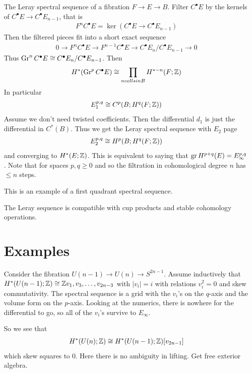 \documentclass[12pt]{article}
\begin{document}
\begin{example}
    The Leray spectral sequence of a fibration $F \to E \to B$. Filter $C^\bullet E$ by the kernels of $C^\bullet E \to C^\bullet E_{n-1}$, that is \begin{align*}
    F^n C^\bullet E = \ker(C^\bullet E \to C^\bullet E_{n-1})
    \end{align*} Then the filtered pieces fit into a short exact sequence \begin{align*}
        0 \to F^n C^\bullet E \to F^{n-1} C^\bullet E \to C^\bullet E_n / C^\bullet E_{n-1} \to 0
    \end{align*} 
    Thus $\operatorname{Gr}^n C^\bullet E \cong C^\bullet E_n / C^\bullet E_{n-1}$. Then \begin{align*}
                H^*(\operatorname{Gr}^p C^\bullet E) \cong \prod_{n cells in B} H^{* - n}(F;\mathbb{Z})
    \end{align*} In particular
    \begin{align*}
        E_1^{p,q} \cong C^p(B;H^q(F;\mathbb{Z}))
    \end{align*}
    Assume we don't need twisted coefficients. Then the differential $d_1$ is just the differential in $C^*(B)$. Thus we get the Leray spectral sequence with $E_2$ page \begin{align*}
    E_2^{p,q} \cong H^p(B;H^q(F;\mathbb{Z}))
    \end{align*} and converging to $H^*(E;\mathbb{Z})$. This is equivalent to saying that $\operatorname{gr} H^{p+q}(E) = E_\infty^{p,q}$. Note that for spaces $p,q\geq 0$ and so the filtration in cohomological degree $n$ has $\leq n$ steps.
\end{example}

This is an example of a first quadrant spectral sequence.
\begin{theorem}
    The Leray sequence is compatible with cup products and stable cohomology operations. 
\end{theorem}
\section{Examples}
Consider the fibration $U(n-1) \to U(n) \to S^{2n-1}$. Assume inductively that $H^*(U(n-1);\mathbb{Z}) \cong \mathbb{Z}{v_1, v_3, \dots, v_{2n-3}}$ with $|v_i| = i$ with relations $v_i^2 = 0$ and skew commutativity. The spectral sequence is a grid with the $v_i$'s on the $q$-axis and the volume form on the $p$-axis. Looking at the numerics, there is nowhere for the differential to go, so all of the $v_i$'s survive to $E_\infty$. 

So we see that \begin{align*}
    H^*(U(n);\mathbb{Z}) \cong H^*(U(n-1);\mathbb{Z})[v_{2n-1}]
\end{align*} which skew squares to $0$. Here there is no ambiguity in lifting. Get free exterior algebra.
\end{document}
